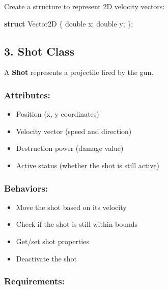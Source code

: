 \documentclass[
]{article}
\newenvironment{Shaded}{\begin{snugshade}}{\end{snugshade}}
\newcommand{\DataTypeTok}[1]{\textcolor[rgb]{0.68,0.00,0.00}{#1}}
\newcommand{\KeywordTok}[1]{\textcolor[rgb]{0.00,0.23,0.31}{\textbf{#1}}}
\newcommand{\NormalTok}[1]{\textcolor[rgb]{0.00,0.23,0.31}{#1}}
\newcommand{\OperatorTok}[1]{\textcolor[rgb]{0.37,0.37,0.37}{#1}}
\providecommand{\tightlist}{%
  \setlength{\itemsep}{0pt}\setlength{\parskip}{0pt}}
\begin{document}
Create a structure to represent 2D velocity vectors:

\begin{Shaded}
\begin{Highlighting}[]
\KeywordTok{struct}\NormalTok{ Vector2D }\OperatorTok{\{}
    \DataTypeTok{double}\NormalTok{ x}\OperatorTok{;}
    \DataTypeTok{double}\NormalTok{ y}\OperatorTok{;}
\OperatorTok{\};}
\end{Highlighting}
\end{Shaded}

\subsection{3. Shot Class}\label{shot-class}

A \textbf{Shot} represents a projectile fired by the gun.

\subsubsection{Attributes:}\label{attributes}

\begin{itemize}
\tightlist
\item
  Position (x, y coordinates)
\item
  Velocity vector (speed and direction)
\item
  Destruction power (damage value)
\item
  Active status (whether the shot is still active)
\end{itemize}

\subsubsection{Behaviors:}\label{behaviors}

\begin{itemize}
\tightlist
\item
  Move the shot based on its velocity
\item
  Check if the shot is still within bounds
\item
  Get/set shot properties
\item
  Deactivate the shot
\end{itemize}

\subsubsection{Requirements:}\label{requirements}
\end{document}
